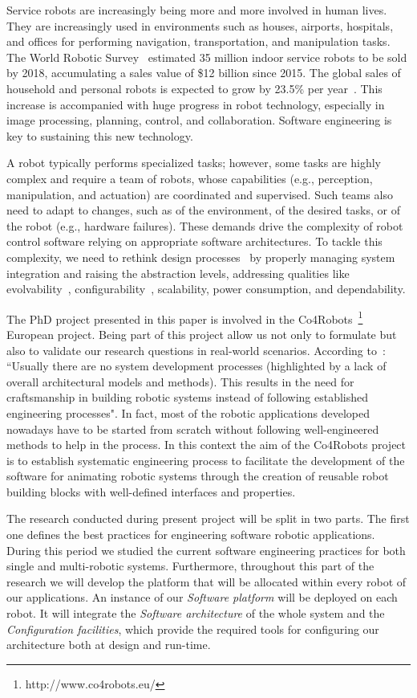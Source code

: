 Service robots are increasingly being more and more involved in human lives. 
They are increasingly used in environments such as houses, airports, hospitals, and offices for performing navigation, transportation, and manipulation tasks. 
The World Robotic Survey~\cite{wrs:online} estimated 35 million indoor service robots to be sold by 2018, accumulating a sales value of \$12 billion since 2015. 
The global sales of household and personal robots is expected to grow by 23.5\% per year~\cite{sheng:online}. 
This increase is accompanied with huge progress in robot technology, especially in image processing, planning, control, and collaboration. Software engineering is key to sustaining this new technology.

A robot typically performs specialized tasks; however, some tasks are highly complex and require a team of robots, whose capabilities (e.g., perception, manipulation, and actuation) are coordinated and supervised. 
Such teams also need to adapt to changes, such as of the environment, of the desired tasks, or of the robot (e.g., hardware failures). 
These demands drive the complexity of robot control software relying on appropriate software architectures. 
To tackle this complexity, we need to rethink design processes~\cite{Lee2008} by properly managing system integration and raising the abstraction levels, addressing qualities like evolvability~\cite{Perez2008}, configurability~\cite{Gamez2013563}, scalability, power consumption, and dependability.

The PhD project presented in this paper is involved in the Co4Robots~\footnote{http://www.co4robots.eu/} European project.
Being part of this project allow us not only to formulate but also to validate our research questions in real-world scenarios.
According to~\cite{roadmap}: ``Usually there are no system development processes (highlighted by a lack of overall architectural models and methods). 
This results in the need for craftsmanship in building robotic systems instead of following established engineering processes".
In fact, most of the robotic applications developed nowadays have to be started from scratch without following well-engineered methods to help in the process.
In this context the aim of the Co4Robots project is to establish systematic engineering process to facilitate the development of the software for animating robotic systems through the creation of reusable robot building blocks with well-defined interfaces and properties. 

The research conducted during present project will be split in two parts.
The first one defines the best practices for engineering software robotic applications.
During this period we studied the current software engineering practices for both single and multi-robotic systems.
Furthermore, throughout this part of the research we will develop the platform that will be allocated within every robot of our applications.
An instance of our \emph{Software platform} will be deployed on each robot.
It will integrate the \emph{Software architecture} of the whole system and  the \emph{Configuration facilities}, which provide the required tools for configuring our architecture both at design and run-time.

